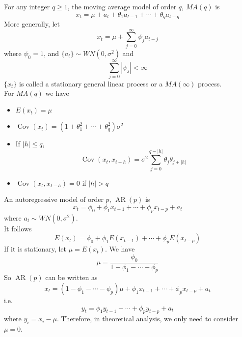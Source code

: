 \documentclass[11pt]{article}
\theoremstyle{definition}
\DeclareMathOperator{\cov}{Cov}
\DeclareMathOperator{\AR}{AR}
\begin{document}
For any integer $q\geq 1$, the moving average model of order $q$, $MA(q)$ is
\[
x_t = \mu + a_t +\theta_1a_{t-1} + \cdots + \theta_q a_{t-q}
\]
More generally, let 
\[
x_t = \mu + \sum_{j=0}^\infty \psi_ja_{t-j}
\]
where $\psi_0 = 1$, and $\{a_t\}\sim WN(0,\sigma^2)$ and
\[
\sum_{j=0}^\infty|\psi_j|<\infty
\]
$\{x_t\}$ is called a stationary general linear process or a $MA(\infty)$ process.\\
For $MA(q)$ we have
\begin{itemize}
  \item $E(x_t) = \mu$
  \item $\cov(x_t)=(1+\theta_1^2 + \cdots + \theta_q^2)\sigma^2$
  \item If $|h|\leq q$,
  \[
\cov(x_t, x_{t-h})=\sigma^2 \sum_{j=0}^{q-|h|} \theta_j\theta_{j+|h|}
  \]
  \item $\cov(x_t, x_{t-h})=0$ if $|h|>q$
\end{itemize}
An autoregressive model of order $p$, $\AR(p)$ is
\[
x_t = \phi_0 + \phi_1x_{t-1} + \cdots + \phi_px_{t-p}+a_t
\]
where $a_t\sim WN(0, \sigma^2)$.\\
It follows
\[
E(x_t) = \phi_0 + \phi_1E(x_{t-1}) + \cdots + \phi_pE(x_{t-p})
\]
If it is stationary, let $\mu = E(x_t)$. We have
\[
\mu = \frac{\phi_0}{1-\phi_1-\cdots-\phi_p}
\]
So $\AR(p)$ can be written as
\[
x_t = (1-\phi_1-\cdots -\phi_p)\mu + \phi_1x_{t-1} + \cdots + \phi_px_{t-p} + a_t
\]
i.e.
\[
y_t = \phi_1 y_{t-1} + \cdots + \phi_py_{t-p} + a_t
\]
where $y_i = x_i - \mu$.
Therefore, in theoretical analysis, we only need to consider $\mu = 0$.\\
\end{document}
